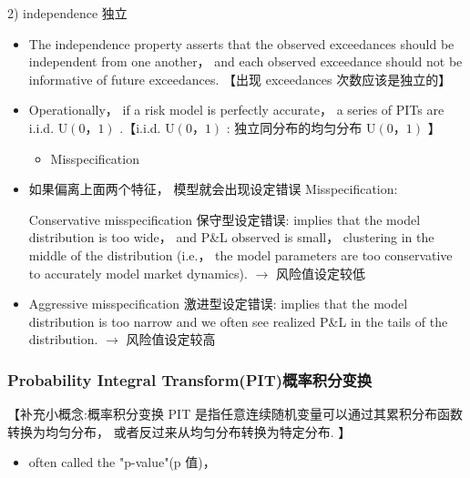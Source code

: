     2) independence 独立
    \begin{itemize}

    \item The independence property asserts that the observed exceedances should be independent from one another， and each observed exceedance should not be informative of future exceedances. 【出现 exceedances 次数应该是独立的】
    
    \item Operationally， if a risk model is perfectly accurate， a series of PITs are i.i.d. \(\mathrm{U}\left( {0，1}\right)\) .【i.i.d. \(\mathrm{U}\left( {0，1}\right)\) : 独立同分布的均匀分布 \(\mathrm{U}\left( {0，1}\right)\) 】
    
    \begin{itemize}
    \item Misspecification
    \end{itemize}
    

   
   



    \item 如果偏离上面两个特征， 模型就会出现设定错误 Misspecification:
    
    Conservative misspecification 保守型设定错误: implies that the model distribution is too wide， and P\&L observed is small， clustering in the middle of the distribution (i.e.， the model parameters are too conservative to accurately model market dynamics). \(\rightarrow\) 风险值设定较低
\end{itemize}

    \begin{itemize}
    \item Aggressive misspecification 激进型设定错误: implies that the model distribution is too narrow and we often see realized P\&L in the tails of the distribution. \(\rightarrow\) 风险值设定较高
    \end{itemize}

\subsubsection{Probability Integral Transform(PIT)概率积分变换}



【补充小概念:概率积分变换 PIT 是指任意连续随机变量可以通过其累积分布函数转换为均匀分布， 或者反过来从均匀分布转换为特定分布. 】

\begin{itemize}
\item often called the "p-value"(p 值)，
\end{itemize}

